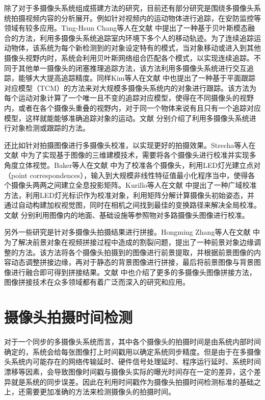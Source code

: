 除了对于多摄像头系统组成搭建方法的研究，目前还有部分研究是围绕多摄像头系统拍摄视频内容的分析展开。例如针对视频内的运动物体进行追踪，在安防监控等领域有较多应用。Ting-Hsun Chang等人在文献 \cite{11} 中提出了一种基于贝叶斯模态融合的方法，利用多摄像头系统追踪室内环境下多个人的移动轨迹。为了连续追踪运动物体，该系统为每个新检测到的对象设定特有的模式，当对象移动或进入到其他摄像头视野内时，系统会利用贝叶斯网络组合匹配各个模式，以实现连续追踪。不同于其他单一摄像头的闭塞推理追踪方法，该方法利用多摄像头系统进行交互追踪，能够大大提高追踪精度。同样Kim等人在文献 \cite{12} 中也提出了一种基于平面跟踪对应模型（TCM）的方法来对大规模多摄像头系统内的对象进行跟踪。该方法为每个运动对象计算了一个唯一且不变的追踪对应模型，使得在不同摄像头的视野内，或者在各个摄像头重叠的视野内，对于同一个物体来说有且只有一个追踪对应模型，这样就能能够准确追踪对象的运动。文献 \cite{zha2013detecting, saini2014w3, wang2013intelligent} 分别介绍了利用多摄像头系统进行对象检测或跟踪的方法。

还比如针对拍摄图像进行多摄像头校准，以实现更好的拍摄效果。Strecha等人在文献 \cite{13} 中为了实现基于图像的三维建模技术，需要将各个摄像头进行校准并实现多角度立体视觉。Baker等人在文献 \cite{14} 中为了校准各个摄像头，利用LED灯光建立点对（point correspondences），输入到大规模非线性特征值最小化程序当中，使得各个摄像头两两之间建立全息投影矩阵。Kurillo等人在文献 \cite{15} 中提出了一种广域校准方法，利用LED灯光标识作为校准对象，利用矩阵分解计算摄像头初始姿态，并通过自动构建加权视觉图，同时在相机之间找到最佳的变换路径来解决全局校准。文献 \cite{theriault2014protocol, knorr2013online, heng2014infrastructure} 分别利用图像内的地面、基础设施等参照物对多路摄像头图像进行校准。

另外一些研究是针对多摄像头拍摄结果进行拼接。Hongming Zhang等人在文献 \cite{16} 中为了解决前景对象在视频拼接过程中造成的割裂问题，提出了一种前景对象边缘调整的方法。该方法将各个摄像头拍摄到的图像进行前景提取，并根据前景图像的内容动态调整拼接边缘，再对于静态的背景图像进行拼接，最后将前景图像与背景图像进行融合即可得到拼接结果。文献 \cite{malesa2014multi, zhong2014color, lu2016photometric} 中也介绍了更多的多摄像头图像拼接方法，图像拼接技术在众多领域都有着广泛而深入的研究和应用。

\section{摄像头拍摄时间检测}

对于一个同步的多摄像头系统而言，其中各个摄像头的拍摄时间是由系统内部时间确定的，系统会给每张图像打上时间戳用以确定系统同步精度。但是由于在多摄像头系统内可能存在的网络传输延时、硬件信号处理延时、程序运行延时、系统时间漂移等因素，会导致图像时间戳与摄像头实际的曝光时间存在一定的差异，这个差异就是系统的同步误差。因此在利用时间戳作为摄像头拍摄时间检测标准的基础之上，还需要更加准确的方法来检测摄像头的拍摄时间。

